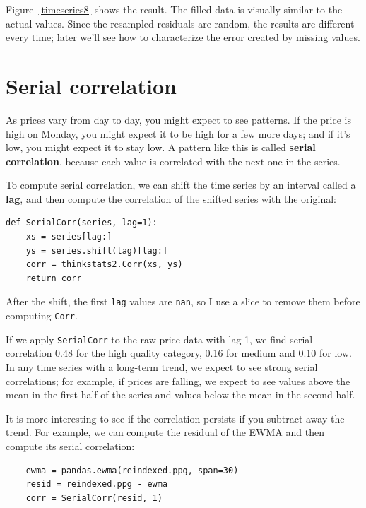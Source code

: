 \documentclass[12pt]{book}
\begin{document}
Figure~\ref{timeseries8} shows the result.  The filled data is visually
similar to the actual values.  Since the resampled residuals are
random, the results are different every time; later we'll see how
to characterize the error created by missing values.


\section{Serial correlation}

As prices vary from day to day, you might expect to see patterns.
If the price is high on Monday,
you might expect it to be high for a few more days; and
if it's low, you might expect it to stay low.  A pattern
like this is called {\bf serial
correlation}, because each value is correlated with the next one
in the series.

To compute serial correlation, we can shift the time series
by an interval called a {\bf lag}, and then compute the correlation
of the shifted series with the original:

\begin{verbatim}
def SerialCorr(series, lag=1):
    xs = series[lag:]
    ys = series.shift(lag)[lag:]
    corr = thinkstats2.Corr(xs, ys)
    return corr
\end{verbatim}

After the shift, the first {\tt lag} values are {\tt nan}, so
I use a slice to remove them before computing {\tt Corr}.


If we apply {\tt SerialCorr} to the raw price data with lag 1, we find
serial correlation 0.48 for the high quality category, 0.16 for
medium and 0.10 for low.  In any time series with a long-term trend,
we expect to see strong serial correlations; for example, if prices
are falling, we expect to see values above the mean in the first
half of the series and values below the mean in the second half.

It is more interesting to see if the correlation persists if you
subtract away the trend.  For example, we can compute the residual
of the EWMA and then compute its serial correlation:

\begin{verbatim}
    ewma = pandas.ewma(reindexed.ppg, span=30)
    resid = reindexed.ppg - ewma
    corr = SerialCorr(resid, 1)
\end{verbatim}
\end{document}
